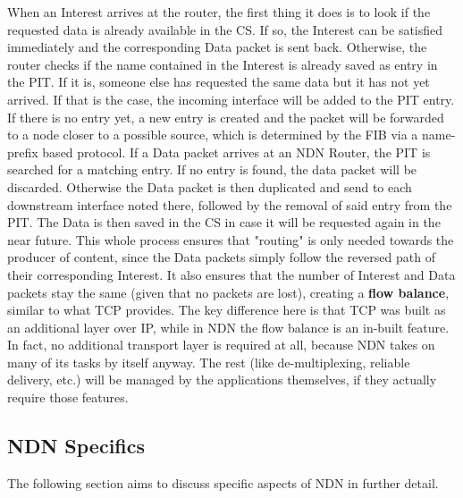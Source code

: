When an Interest arrives at the router, the first thing it does is to look if the requested data is already available in the CS. If so, the Interest can be satisfied immediately and the corresponding Data packet is sent back. Otherwise, the router checks if the name contained in the Interest is already saved as entry in the PIT. If it is, someone else has requested the same data but it has not yet arrived. If that is the case, the incoming interface will be added to the PIT entry. If there is no entry yet, a new entry is created and the packet will be forwarded to a node closer to a possible source, which is determined by the FIB via a name-prefix based protocol. If a Data packet arrives at an NDN Router, the PIT is searched for a matching entry. If no entry is found, the data packet will be discarded. Otherwise the Data packet is then duplicated and send to each downstream interface noted there, followed by the removal of said entry from the PIT. The Data is then saved in the CS in case it will be requested again in the near future. This whole process ensures that "routing" is only needed towards the producer of content, since the Data packets simply follow the reversed path of their corresponding Interest. It also ensures that the number of Interest and Data packets stay the same (given that no packets are lost), creating a \textbf{flow balance}, similar to what TCP provides. The key difference here is that TCP was built as an additional layer over IP, while in NDN the flow balance is an in-built feature. In fact, no additional transport layer is required at all, because NDN takes on many of its tasks by itself anyway. The rest (like de-multiplexing, reliable delivery, etc.) will be managed by the applications themselves, if they actually require those features. \cite{ZABJ14}


\subsection{NDN Specifics}
The following section aims to discuss specific aspects of NDN in further detail. %

